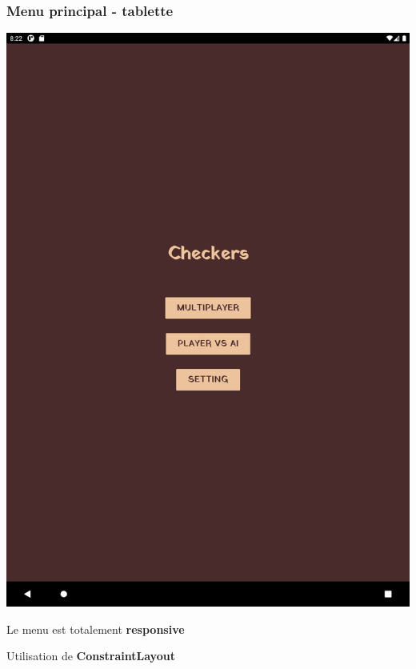 \documentclass{beamer}
\begin{document}
\begin{frame}
  \frametitle{Menu principal - tablette}

  \begin{center}
    \includegraphics[scale=0.06]{menu_tablet.png}
  \end{center}

  \begin{center}
    Le menu est totalement \textbf{responsive}
  
    Utilisation de \textbf{ConstraintLayout}
  \end{center}

\end{frame}
\end{document}
